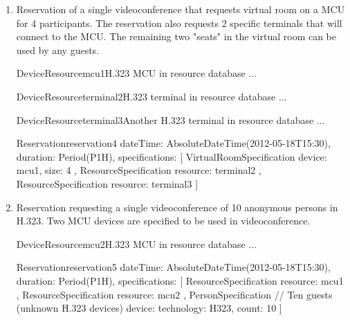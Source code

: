 \begin{enumerate}
\begin{EntityExample}{Reservation}{reservation3}{}
dateTime: AbsoluteDateTime(2012-05-18T15:30), duration: Period(P1H),
specifications: [
  PersonSpecification { // Martin Srom (must choose a device)
    identity: UserIdentity(srom@cesnet.cz)
  },
  PersonSpecification { // Petr Holub (must choose a device)
    identity: UserIdentity(hopet@cesnet.cz)
  },
  PersonSpecification { // Jan Ruzicka (must choose a device)
    identity: UserIdentity(janru@cesnet.cz)
  }
]
\end{EntityExample}

\item Reservation of a single videoconference that requests virtual room on a MCU for 4 participants. The reservation also requests 2 specific terminals that will connect to the MCU. The remaining two "seats" in the virtual room can be used by any guests.

\begin{EntityExample}{DeviceResource}{mcu1}{H.323 MCU in resource database}
...
\end{EntityExample}

\begin{EntityExample}{DeviceResource}{terminal2}{H.323 terminal in resource database}
...
\end{EntityExample}

\begin{EntityExample}{DeviceResource}{terminal3}{Another H.323 terminal in resource database}
...
\end{EntityExample}

\begin{EntityExample}{Reservation}{reservation4}{}
dateTime: AbsoluteDateTime(2012-05-18T15:30), duration: Period(P1H),
specifications: [
  VirtualRoomSpecification {
    device: mcu1,
    size: 4
  },
  ResourceSpecification {
    resource: terminal2
  },
  ResourceSpecification {
    resource: terminal3
  }
]
\end{EntityExample}

\item Reservation requesting a single videoconference of 10 anonymous persons in H.323. Two MCU devices are specified to be used in videoconference.


\begin{EntityExample}{DeviceResource}{mcu2}{H.323 MCU in resource database}
...
\end{EntityExample}

\begin{EntityExample}{Reservation}{reservation5}{}
dateTime: AbsoluteDateTime(2012-05-18T15:30), duration: Period(P1H),
specifications: [
  ResourceSpecification {
    resource: mcu1
  },
  ResourceSpecification {
    resource: mcu2
  },
  PersonSpecification { // Ten guests (unknown H.323 devices)
    device: {technology: H323},
    count: 10
  }
]
\end{EntityExample}

\end{enumerate}

